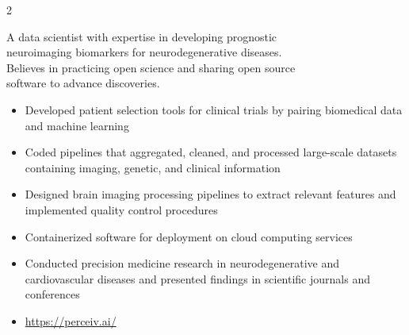 \documentclass[10pt,a4paper,ragged2e,withhyper]{altacv}
\begin{document}

\makecvheader



\begin{paracol}{2}


A data scientist with expertise in developing prognostic \\ neuroimaging biomarkers for neurodegenerative diseases. \\ Believes in practicing open science and sharing open source \\ software to advance discoveries.
\smallskip



\begin{itemize}
    \item Developed patient selection tools for clinical trials by pairing biomedical data and machine learning
    \item Coded pipelines that aggregated, cleaned, and processed large-scale datasets containing imaging, genetic, and clinical information
    \item Designed brain imaging processing pipelines to extract relevant features and implemented quality control procedures
    \item Containerized software for deployment on cloud computing services
    \item Conducted precision medicine research in neurodegenerative and cardiovascular diseases and presented findings in scientific journals and conferences
    \item \url{https://perceiv.ai/}
\end{itemize}


\end{paracol}
\end{document}
